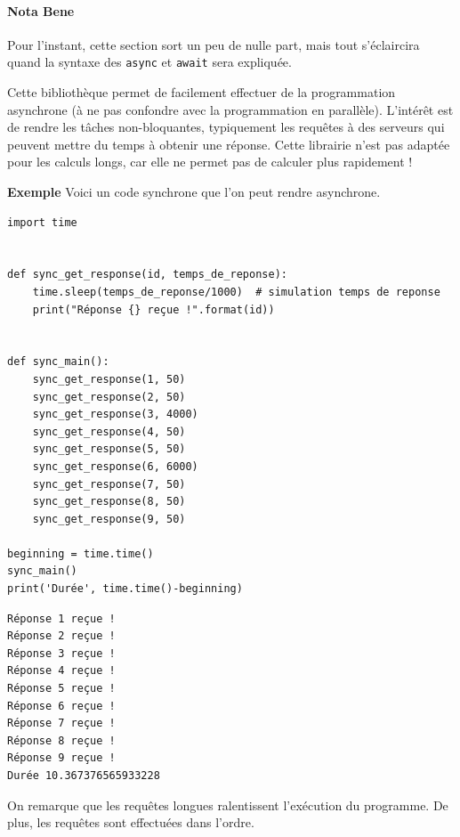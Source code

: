 \documentclass[a4paper, 10pt]{article}
\begin{document}
\paragraph{Nota Bene} Pour l'instant, cette section sort un peu de nulle part, mais tout s'éclaircira quand la syntaxe des \texttt{async} et \texttt{await} sera expliquée.\bigskip

Cette bibliothèque permet de facilement effectuer de la programmation asynchrone (à ne pas confondre avec la programmation en parallèle). L'intérêt est de rendre les tâches non-bloquantes, typiquement les requêtes à des serveurs qui peuvent mettre du temps à obtenir une réponse. Cette librairie n'est pas adaptée pour les calculs longs, car elle ne permet pas de calculer plus rapidement !\bigskip

\textbf{Exemple} Voici un code synchrone que l'on peut rendre asynchrone.
\begin{verbatim}
import time


def sync_get_response(id, temps_de_reponse):
    time.sleep(temps_de_reponse/1000)  # simulation temps de reponse
    print("Réponse {} reçue !".format(id))


def sync_main():
    sync_get_response(1, 50)
    sync_get_response(2, 50)
    sync_get_response(3, 4000)
    sync_get_response(4, 50)
    sync_get_response(5, 50)
    sync_get_response(6, 6000)
    sync_get_response(7, 50)
    sync_get_response(8, 50)
    sync_get_response(9, 50)

beginning = time.time()
sync_main()
print('Durée', time.time()-beginning)
\end{verbatim}

\begin{verbatim}
Réponse 1 reçue !
Réponse 2 reçue !
Réponse 3 reçue !
Réponse 4 reçue !
Réponse 5 reçue !
Réponse 6 reçue !
Réponse 7 reçue !
Réponse 8 reçue !
Réponse 9 reçue !
Durée 10.367376565933228
\end{verbatim}
On remarque que les requêtes longues ralentissent l'exécution du programme. De plus, les requêtes sont effectuées dans l'ordre.
\end{document}
